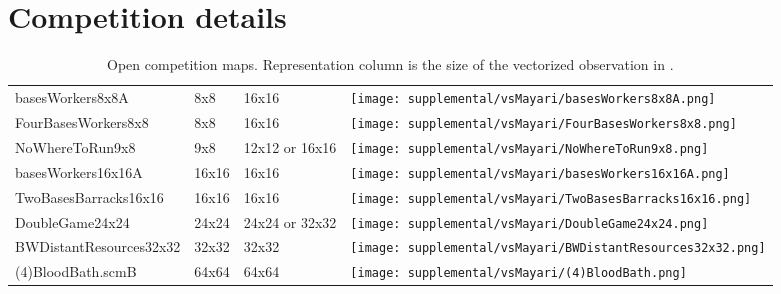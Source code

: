 \documentclass{article}
\begin{document}



\clearpage

\appendix
\section{Competition details}
\begin{table}[H]
    \centering
    \begin{threeparttable}
        \caption{Open competition maps. Representation column is the size of the vectorized observation in \agentName.}
        \label{tab:open-maps}
            \begin{tabular}{>{\centering\arraybackslash}m{4cm}>{\centering\arraybackslash}m{2cm}>{\centering\arraybackslash}m{2cm}>{\centering\arraybackslash}m{2.25cm}}
                \multicolumn{1}{c}{\bf Name}  &\multicolumn{1}{c}{\bf Size}
                &\multicolumn{1}{c}{\bf Representation}
                &\multicolumn{1}{c}{\bf Start} \\ \hline
                basesWorkers8x8A & 8x8 & 16x16 &
                \texttt{[image: supplemental/vsMayari/basesWorkers8x8A.png]} \\
                FourBasesWorkers8x8 & 8x8 & 16x16 &
                \texttt{[image: supplemental/vsMayari/FourBasesWorkers8x8.png]} \\
                NoWhereToRun9x8 & 9x8 & 12x12\tnote{*} or 16x16\tnote{\P} &
                \texttt{[image: supplemental/vsMayari/NoWhereToRun9x8.png]} \\
                basesWorkers16x16A & 16x16 & 16x16 &
                \texttt{[image: supplemental/vsMayari/basesWorkers16x16A.png]} \\
                TwoBasesBarracks16x16 & 16x16 & 16x16 &
                \texttt{[image: supplemental/vsMayari/TwoBasesBarracks16x16.png]}
                \\
                DoubleGame24x24 & 24x24 & 24x24\tnote{\dag} or 32x32\tnote{\ddag} &
                \texttt{[image: supplemental/vsMayari/DoubleGame24x24.png]} \\
                BWDistantResources32x32 & 32x32 & 32x32 &
                \texttt{[image: supplemental/vsMayari/BWDistantResources32x32.png]}
                \\
                (4)BloodBath.scmB & 64x64 & 64x64 &
                \texttt{[image: supplemental/vsMayari/(4)BloodBath.png]} \\

\end{tabular}
\end{threeparttable}
\end{table}
\end{document}
